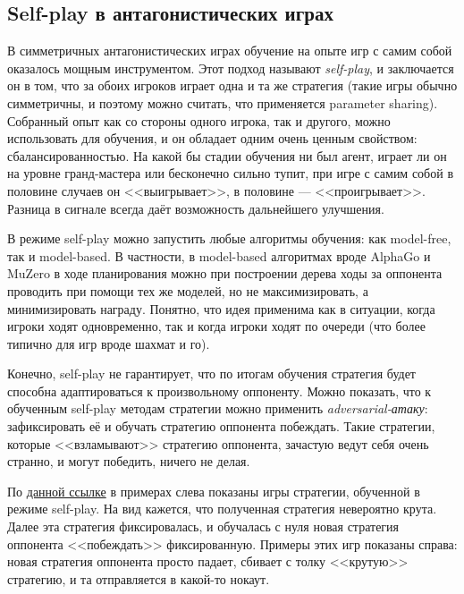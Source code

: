 \subsection{Self-play в антагонистических играх}

В симметричных антагонистических играх обучение на опыте игр с самим собой оказалось мощным инструментом. Этот подход называют \emph{self-play}, и заключается он в том, что за обоих игроков играет одна и та же стратегия (такие игры обычно симметричны, и поэтому можно считать, что применяется parameter sharing). Собранный опыт как со стороны одного игрока, так и другого, можно использовать для обучения, и он обладает одним очень ценным свойством: сбалансированностью. На какой бы стадии обучения ни был агент, играет ли он на уровне гранд-мастера или бесконечно сильно тупит, при игре с самим собой в половине случаев он <<выигрывает>>, в половине --- <<проигрывает>>. Разница в сигнале всегда даёт возможность дальнейшего улучшения.

В режиме self-play можно запустить любые алгоритмы обучения: как model-free, так и model-based. В частности, в model-based алгоритмах вроде AlphaGo и MuZero в ходе планирования можно при построении дерева ходы за оппонента проводить при помощи тех же моделей, но не максимизировать, а минимизировать награду. Понятно, что идея применима как в ситуации, когда игроки ходят одновременно, так и когда игроки ходят по очереди (что более типично для игр вроде шахмат и го).

Конечно, self-play не гарантирует, что по итогам обучения стратегия будет способна адаптироваться к произвольному оппоненту. Можно показать, что к обученным self-play методам стратегии можно применить \emph{adversarial-атаку}: зафиксировать её и обучать стратегию оппонента побеждать. Такие стратегии, которые <<взламывают>> стратегию оппонента, зачастую ведут себя очень странно, и могут победить, ничего не делая.

\begin{example}
По \href{https://adversarialpolicies.github.io/}{данной ссылке} в примерах слева показаны игры стратегии, обученной в режиме self-play. На вид кажется, что полученная стратегия невероятно крута. Далее эта стратегия фиксировалась, и обучалась с нуля новая стратегия оппонента <<побеждать>> фиксированную. Примеры этих игр показаны справа: новая стратегия оппонента просто падает, сбивает с толку <<крутую>> стратегию, и та отправляется в какой-то нокаут.
\end{example}

